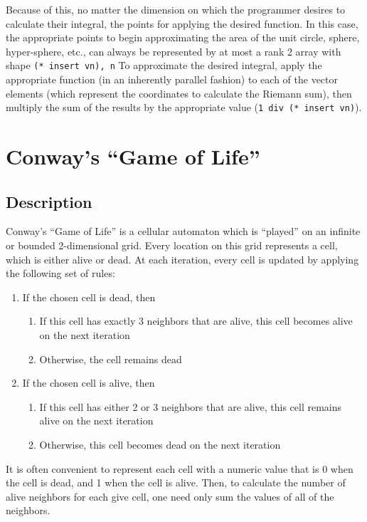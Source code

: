Because of this, no matter the dimension on which the programmer desires to calculate their integral, 
the points for applying the desired function.
In this case, the appropriate points to begin approximating the area of the unit circle, sphere, hyper-sphere, etc.,
can always be represented by at most a rank 2 array with shape \texttt{(* insert vn), n}
To approximate the desired integral, apply the appropriate function (in an inherently parallel fashion) 
to each of the vector elements (which represent the coordinates to calculate the Riemann sum), 
then multiply the sum of the results by the appropriate value (\texttt{1 div (* insert vn)}).

\section{Conway's ``Game of Life''}
\subsection{Description}
Conway's ``Game of Life''\cite{gol} is a cellular automaton which is ``played'' on an infinite or bounded 2-dimensional grid. 
Every location on this grid represents a cell, which is either alive or dead. 
At each iteration, every cell is updated by applying the following set of rules:

\begin{enumerate}
	\item If the chosen cell is dead, then
	\begin{enumerate}
		\item If this cell has exactly 3 neighbors that are alive, 
			this cell becomes alive on the next iteration
		\item Otherwise, the cell remains dead
	\end{enumerate}
	\item If the chosen cell is alive, then
	\begin{enumerate}
		\item If this cell has either 2 or 3 neighbors that are alive, 
			this cell remains alive on the next iteration
		\item Otherwise, this cell becomes dead on the next iteration
	\end{enumerate}
\end{enumerate}

It is often convenient to represent each cell with a numeric value 
that is 0 when the cell is dead, and 1 when the cell is alive. 
Then, to calculate the number of alive neighbors for each give cell, 
one need only sum the values of all of the neighbors.

